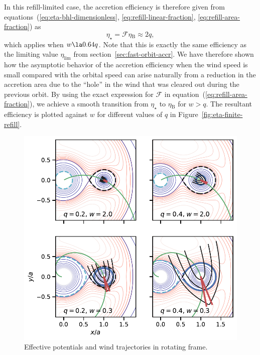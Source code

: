 \documentclass[useAMS, usenatbib, a4paper]{mnras}
\newcommand\bhl{\ensuremath{_{\mathrm{\scriptscriptstyle B}}}}
\begin{document}
In this refill-limited case, the accretion efficiency is therefore given
from equations~(\ref{eq:eta-bhl-dimensionless}, \ref{eq:refill-linear-fraction},
\ref{eq:refill-area-fraction}) as
\begin{equation}
  \label{eq:eta-refill}
  \eta_{\star} = \mathcal{F} \eta\bhl \approx 2 q ,
\end{equation}
which applies when \(w \la 0.64 q\).
Note that this is exactly the same efficiency as the limiting value
\(\eta_{\lim}\) from section~\ref{sec:fast-orbit-accr}.
We have therefore shown how the asymptotic behavior of the accretion efficiency
when the wind speed is small compared with the orbital speed
can arise naturally from a reduction in the accretion area due to
the ``hole'' in the wind that was cleared out during the previous orbit.
By using the exact expression for \(\mathcal{F} \) in equation~(\ref{eq:refill-area-fraction}),
we achieve a smooth transition from \(\eta_{\star}\) to \(\eta\bhl\) for \(w > q\).
The resultant efficiency is plotted against \(w\) for different
values of \(q\) in Figure~\ref{fig:eta-finite-refill}. 

\begin{figure}
  \centering
  \includegraphics[width=\linewidth]{notebooks/roche-potential-trajectories}
  \caption{
    Effective potentials and wind trajectories in rotating frame.
  }
  \label{fig:roche-potential-trajectories}
\end{figure}
\end{document}
